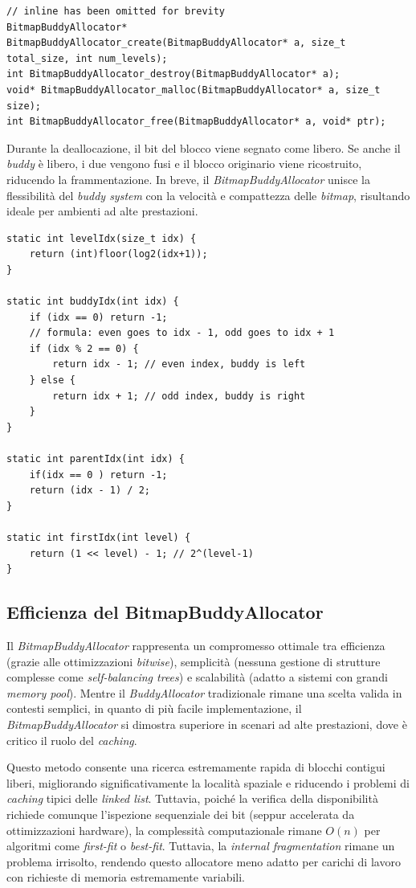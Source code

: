 \begin{lstlisting}
// inline has been omitted for brevity
BitmapBuddyAllocator* BitmapBuddyAllocator_create(BitmapBuddyAllocator* a, size_t total_size, int num_levels);
int BitmapBuddyAllocator_destroy(BitmapBuddyAllocator* a);
void* BitmapBuddyAllocator_malloc(BitmapBuddyAllocator* a, size_t size);
int BitmapBuddyAllocator_free(BitmapBuddyAllocator* a, void* ptr);
\end{lstlisting}

Durante la deallocazione, il bit del blocco viene segnato come libero. Se anche il \textit{buddy} è libero, i due vengono fusi e il blocco originario viene ricostruito, riducendo la frammentazione. In breve, il \textit{BitmapBuddyAllocator} unisce la flessibilità del \textit{buddy system} con la velocità e compattezza delle \textit{bitmap}, risultando ideale per ambienti ad alte prestazioni.

\begin{lstlisting}
static int levelIdx(size_t idx) {
    return (int)floor(log2(idx+1));
}

static int buddyIdx(int idx) {
    if (idx == 0) return -1;
    // formula: even goes to idx - 1, odd goes to idx + 1
    if (idx % 2 == 0) {
        return idx - 1; // even index, buddy is left
    } else {
        return idx + 1; // odd index, buddy is right
    }
}

static int parentIdx(int idx) {
    if(idx == 0 ) return -1;
    return (idx - 1) / 2;
}

static int firstIdx(int level) {
    return (1 << level) - 1; // 2^(level-1)
}
\end{lstlisting}

\subsection*{Efficienza del BitmapBuddyAllocator}
Il \textit{BitmapBuddyAllocator} rappresenta un compromesso ottimale tra efficienza (grazie alle ottimizzazioni \textit{bitwise}), semplicità (nessuna gestione di strutture complesse come \textit{self-balancing trees}) e scalabilità (adatto a sistemi con grandi \textit{memory pool}). Mentre il \textit{BuddyAllocator} tradizionale rimane una scelta valida in contesti semplici, in quanto di più facile implementazione, il \textit{BitmapBuddyAllocator} si dimostra superiore in scenari ad alte prestazioni, dove è critico il ruolo del \textit{caching}. 

Questo metodo consente una ricerca estremamente rapida di blocchi contigui liberi, migliorando significativamente la località spaziale e riducendo i problemi di \textit{caching} tipici delle \textit{linked list}. Tuttavia, poiché la verifica della disponibilità richiede comunque l’ispezione sequenziale dei bit (seppur accelerata da ottimizzazioni hardware), la complessità computazionale rimane $O(n)$ per algoritmi come \textit{first-fit} o \textit{best-fit}. Tuttavia, la \textit{internal fragmentation} rimane un problema irrisolto, rendendo questo allocatore meno adatto per carichi di lavoro con richieste di memoria estremamente variabili.

